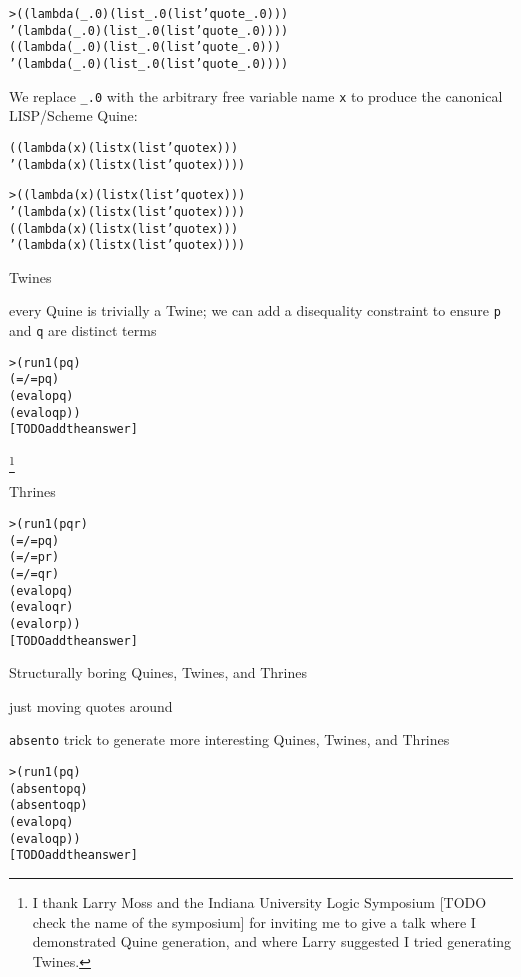 \documentclass{book}
\begin{document}
\begin{alltt}
> ((lambda (_.0) (list _.0 (list 'quote _.0)))
    '(lambda (_.0) (list _.0 (list 'quote _.0))))
((lambda (_.0) (list _.0 (list 'quote _.0)))
  '(lambda (_.0) (list _.0 (list 'quote _.0))))
\end{alltt}

We replace \verb|_.0| with the arbitrary free variable name \verb|x| to produce the canonical LISP/Scheme Quine:

\begin{alltt}
((lambda (x) (list x (list 'quote x)))
 '(lambda (x) (list x (list 'quote x))))
\end{alltt}

\begin{alltt}
> ((lambda (x) (list x (list 'quote x)))
   '(lambda (x) (list x (list 'quote x))))
((lambda (x) (list x (list 'quote x)))
  '(lambda (x) (list x (list 'quote x))))
\end{alltt}

Twines

every Quine is trivially a Twine; we can add a disequality constraint to ensure \verb|p| and \verb|q| are distinct terms

\begin{alltt}
> (run 1 (p q)
    (=/= p q)
    (evalo p q)
    (evalo q p))
[TODO add the answer]
\end{alltt}

\footnote{I thank Larry Moss and the Indiana University Logic Symposium [TODO check the name of the symposium] for inviting me to give a talk where I demonstrated Quine generation, and where Larry suggested I tried generating Twines.}

Thrines

\begin{alltt}
> (run 1 (p q r)
    (=/= p q)
    (=/= p r)
    (=/= q r)    
    (evalo p q)
    (evalo q r)
    (evalo r p))
[TODO add the answer]
\end{alltt}


Structurally boring Quines, Twines, and Thrines

just moving quotes around

\verb|absento| trick to generate more interesting Quines, Twines, and Thrines

\begin{alltt}
> (run 1 (p q)
    (absento p q)
    (absento q p)    
    (evalo p q)
    (evalo q p))
[TODO add the answer]
\end{alltt}
\end{document}
